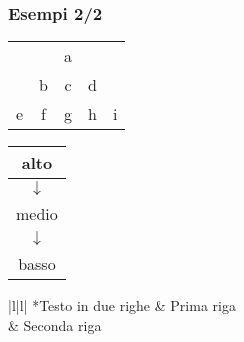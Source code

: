 \begin{frame}
 
 \frametitle{Esempi 2/2}

  \begin{centering}

  \begin{tabular}{|c|c|c|c|c|}
   \cline{3-3}
   \multicolumn{2}{c|}{} & a & \multicolumn{2}{c}{}\\
   \cline{2-4}
   \multicolumn{1}{c|}{} & b & c & d & \multicolumn{1}{c}{}\\
   \hline
   e & f & g & h & i\\
   \hline
  \end{tabular}
  \vspace{0,8cm}

  \begin{tabular}{c}
   \hline
   \multicolumn{1}{|c|}{alto}\\
   \hline
   $\downarrow$\\
   \hline
   \multicolumn{1}{|c|}{medio}\\
   \hline
   $\downarrow$\\
   \hline
   \multicolumn{1}{|c|}{basso}\\
   \hline
  \end{tabular}
  \vspace{0,8cm}

  \begin{tabular}{|l|l|}
   \hline
   *{Testo in due righe} & Prima riga \\
   & Seconda riga\\
   \hline
  \end{tabular}

  \end{centering}

\end{frame}
